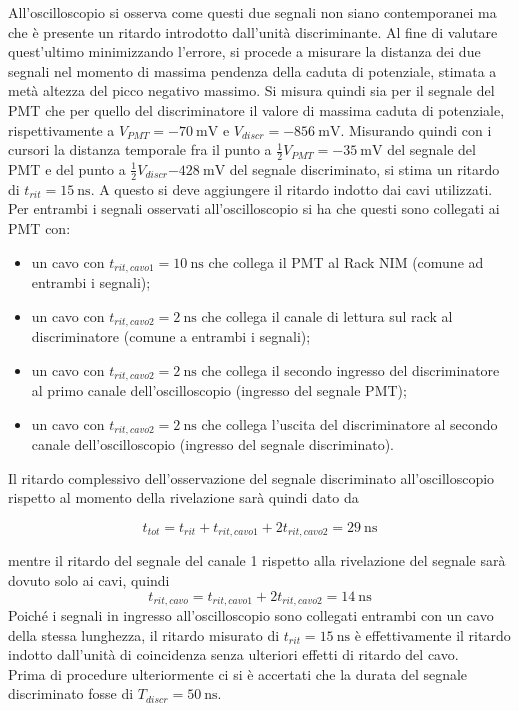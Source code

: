 \documentclass[10pt,a4paper]{article}
\begin{document}
All'oscilloscopio si osserva come questi due segnali non siano contemporanei ma che è presente un ritardo introdotto dall'unità discriminante. Al fine di valutare quest'ultimo minimizzando l'errore, si procede a misurare la distanza dei due segnali nel momento di massima pendenza della caduta di potenziale, stimata a metà altezza del picco negativo massimo. Si misura quindi sia per il segnale del PMT che per quello del discriminatore il valore di massima caduta di potenziale, rispettivamente a $V_{PMT}=\SI{-70}{\milli \volt}$ e $V_{discr}=\SI{-856}{\milli \volt}$. Misurando quindi con i cursori la distanza temporale fra il punto a $\frac{1}{2}V_{PMT}=\SI{-35}{\milli \volt}$ del segnale del PMT e del punto a $\frac{1}{2}V_{discr}\SI{-428}{\milli \volt}$ del segnale discriminato, si stima un ritardo di $t_{rit}=\SI{15}{\nano \second}$. A questo si deve aggiungere il ritardo indotto dai cavi utilizzati. Per entrambi i segnali osservati all'oscilloscopio si ha che questi sono collegati ai PMT con:

\begin{itemize}
    \item un cavo con $t_{rit, cavo1}=\SI{10}{\nano \second}$ che collega il PMT al Rack NIM (comune ad entrambi i segnali);
    \item un cavo con $t_{rit, cavo2}=\SI{2}{\nano \second}$ che collega il canale di lettura sul rack al discriminatore (comune a entrambi i segnali);
    \item un cavo con $t_{rit, cavo2}=\SI{2}{\nano \second}$ che collega il secondo ingresso del discriminatore al primo canale dell'oscilloscopio (ingresso del segnale PMT);
    \item un cavo con $t_{rit, cavo2}=\SI{2}{\nano \second}$ che collega l'uscita del discriminatore al secondo canale dell'oscilloscopio (ingresso del segnale discriminato).
\end{itemize} 
Il ritardo complessivo dell'osservazione del segnale discriminato all'oscilloscopio rispetto al momento della rivelazione sarà quindi dato da

\[t_{tot}=t_{rit}+t_{rit, cavo1}+2t_{rit, cavo2}=\SI{29}{\nano \second}\]

mentre il ritardo del segnale del canale 1 rispetto alla rivelazione del segnale sarà dovuto solo ai cavi, quindi \[t_{rit, cavo}=t_{rit, cavo1}+2t_{rit, cavo2}=\SI{14}{\nano \second}\]
Poiché i segnali in ingresso all'oscilloscopio sono collegati entrambi con un cavo della stessa lunghezza, il ritardo misurato di $t_{rit}=\SI{15}{\nano \second}$ è effettivamente il ritardo indotto dall'unità di coincidenza senza ulteriori effetti di ritardo del cavo. \\
Prima di procedure ulteriormente ci si è accertati che la durata del segnale discriminato fosse di $T_{discr}=\SI{50}{\nano \second}$.
\end{document}
